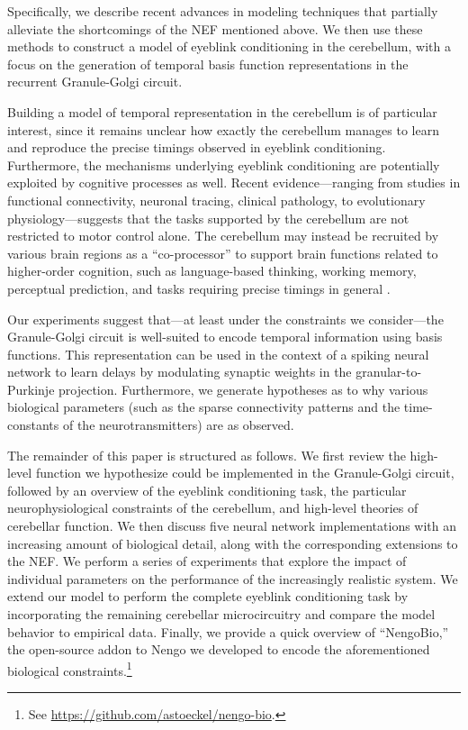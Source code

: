 Specifically, we describe recent advances in modeling techniques that partially alleviate the shortcomings of the NEF mentioned above.
We then use these methods to construct a model of eyeblink conditioning in the cerebellum, with a focus on the generation of temporal basis function representations in the recurrent Granule-Golgi circuit.

Building a model of temporal representation in the cerebellum is of particular interest, since it remains unclear how exactly the cerebellum manages to learn and reproduce the precise timings observed in eyeblink conditioning. Furthermore, the mechanisms underlying eyeblink conditioning are potentially exploited by cognitive processes as well. Recent evidence---ranging from studies in functional connectivity, neuronal tracing, clinical pathology, to evolutionary physiology---suggests that the tasks supported by the cerebellum are not restricted to motor control alone. The cerebellum may instead be recruited by various brain regions as a \enquote{co-processor} to support brain functions related to higher-order cognition, such as language-based thinking, working memory, perceptual prediction, and tasks requiring precise timings in general \citep{sullivan2010cognitive,
           buckner2013cerebellum,
		   oreilly2008cerebellum,
           e2014metaanalysis}.

Our experiments suggest that---at least under the constraints we consider---the Granule-Golgi circuit is well-suited to encode temporal information using basis functions. This representation can be used in the context of a spiking neural network to learn delays by modulating synaptic weights in the granular-to-Purkinje projection.
Furthermore, we generate hypotheses as to why various biological parameters (such as the sparse connectivity patterns and the time-constants of the neurotransmitters) are as observed.

The remainder of this paper is structured as follows.
We first review the high-level function we hypothesize could be implemented in the Granule-Golgi circuit, followed by an overview of the eyeblink conditioning task, the particular neurophysiological constraints of the cerebellum, and high-level theories of cerebellar function.
We then discuss five neural network implementations with an increasing amount of biological detail, along with the corresponding extensions to the NEF.
We perform a series of experiments that explore the impact of individual parameters on the performance of the increasingly realistic system.
We extend our model to perform the complete eyeblink conditioning task by incorporating the remaining cerebellar microcircuitry and compare the model behavior to empirical data.
Finally, we provide a quick overview of \enquote{NengoBio,} the open-source addon to Nengo we developed to encode the aforementioned biological constraints.\footnote{See \url{https://github.com/astoeckel/nengo-bio}.}

